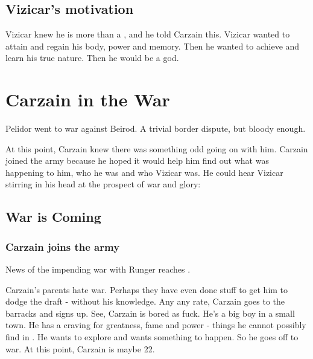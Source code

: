 \begin{garbage}
\subsection{Vizicar's motivation}
Vizicar knew he is more than a \human, and he told Carzain this. 
Vizicar wanted to attain \kenosis{} and regain his body, power and memory. 
Then he wanted to achieve \apotheosis{} and learn his true nature.
Then he would be a god.












\section{Carzain in the War}
Pelidor went to war against Beirod. 
A trivial border dispute, but bloody enough. 

At this point, Carzain knew there was something odd going on with him. 
Carzain joined the army because he hoped it would help him find out what was happening to him, who he was and who Vizicar was. 
He could hear Vizicar stirring in his head at the prospect of war and glory: 

\begin{prose}
\end{prose}







\subsection{War is Coming}







\subsubsection{Carzain joins the army}
News of the impending war with Runger reaches \Redglen. 

Carzain's parents hate war. Perhaps they have even done stuff to get him to dodge the draft - without his knowledge. Any any rate, Carzain goes to the barracks and signs up. See, Carzain is bored as fuck. He's a big boy in a small town. He has a craving for greatness, fame and power - things he cannot possibly find in \Redglen. He wants to explore and wants something to happen. So he goes off to war. At this point, Carzain is maybe 22. 


\end{garbage}
